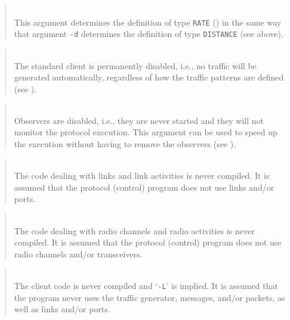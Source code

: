 \begin{quote}
\noindent{}\\ \hspace{0in}
This argument determines the definition of type {\tt RATE}
() in the same way that argument {\tt -d} determines the
definition of type {\tt DISTANCE} (see above).
\end{quote}

\begin{quote}
\noindent{}\\ \hspace{0in}
The standard client is permanently disabled, i.e., no traffic will be
generated automatically, regardless of how the traffic patterns are
defined (see ).
\end{quote}

\begin{quote}
\noindent{}\\ \hspace{0in}
Observers are disabled, i.e., they are never started and they will not
monitor the protocol execution.
This argument can be used to speed up the execution without having
to remove the observers (see ).
\end{quote}

\begin{quote}
\noindent{}\\ \hspace{0in}
The code dealing with links and link activities
is never compiled. It is assumed that the protocol (control) program
does not use links and/or ports.
\end{quote}

\begin{quote}
\noindent{}\\ \hspace{0in}
The code dealing with radio channels and radio activities
is never compiled. It is assumed that the protocol (control) program
does not use radio channels and/or transceivers.
\end{quote}

\begin{quote}
\noindent{}\\ \hspace{0in}
The client code is never compiled and `{\tt -L}' is implied.
It is assumed that the program never uses
the traffic generator, messages, and/or packets, as well as links and/or
ports.
\end{quote}

